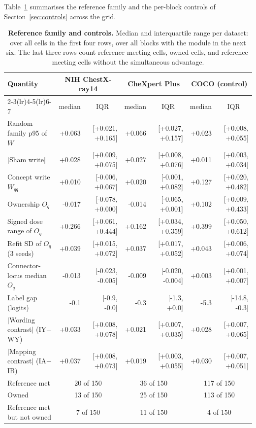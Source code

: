 \documentclass{article}
\begin{document}
Table~\ref{tab:cf-controls} summarises the reference family and the per-block controls of Section~\ref{sec:controls} across the grid.

\begin{table}[h]
\centering
\scriptsize
\setlength{\tabcolsep}{4pt}
\caption{\textbf{Reference family and controls.} Median and interquartile range per dataset: over all cells in the first four rows, over all blocks with the module in the next six. The last three rows count reference-meeting cells, owned cells, and reference-meeting cells without the simultaneous advantage.}
\label{tab:cf-controls}
\begin{tabular}{lrrrrrr}
\toprule
\multirow{2}{*}{Quantity} & \multicolumn{2}{c}{NIH ChestX-ray14} & \multicolumn{2}{c}{CheXpert Plus} & \multicolumn{2}{c}{COCO (control)}\\
\cmidrule(lr){2-3}\cmidrule(lr){4-5}\cmidrule(lr){6-7}
& \multicolumn{1}{c}{median} & \multicolumn{1}{c}{IQR} & \multicolumn{1}{c}{median} & \multicolumn{1}{c}{IQR} & \multicolumn{1}{c}{median} & \multicolumn{1}{c}{IQR}\\
\midrule
Random-family p95 of $W$ & +0.063 & [+0.021, +0.165] & +0.066 & [+0.027, +0.157] & +0.023 & [+0.008, +0.055] \\
$|$Sham write$|$ & +0.028 & [+0.009, +0.075] & +0.027 & [+0.008, +0.076] & +0.011 & [+0.003, +0.034] \\
Concept write $W_{qq}$ & +0.010 & [-0.006, +0.067] & +0.020 & [-0.001, +0.082] & +0.127 & [+0.020, +0.482] \\
Ownership $O_q$ & -0.017 & [-0.078, +0.000] & -0.014 & [-0.065, +0.001] & +0.102 & [+0.009, +0.433] \\
Signed dose range of $O_q$ & +0.266 & [+0.061, +0.444] & +0.162 & [+0.034, +0.359] & +0.399 & [+0.050, +0.612] \\
Refit SD of $O_q$ (3 seeds) & +0.039 & [+0.015, +0.072] & +0.037 & [+0.017, +0.052] & +0.043 & [+0.006, +0.074] \\
Connector-locus median $O_q$ & -0.013 & [-0.023, -0.005] & -0.009 & [-0.020, -0.004] & +0.003 & [+0.001, +0.007] \\
Label gap (logits) & -0.1 & [-0.9, -0.0] & -0.3 & [-1.3, +0.0] & -5.3 & [-14.8, -0.3] \\
$|$Wording contrast$|$ (IY$-$WY) & +0.033 & [+0.008, +0.078] & +0.021 & [+0.007, +0.035] & +0.028 & [+0.007, +0.065] \\
$|$Mapping contrast$|$ (IA$-$IB) & +0.037 & [+0.008, +0.073] & +0.019 & [+0.003, +0.055] & +0.030 & [+0.007, +0.051] \\
\midrule
Reference met & \multicolumn{2}{c}{20 of 150} & \multicolumn{2}{c}{36 of 150} & \multicolumn{2}{c}{117 of 150} \\
Owned & \multicolumn{2}{c}{13 of 150} & \multicolumn{2}{c}{25 of 150} & \multicolumn{2}{c}{113 of 150} \\
Reference met but not owned & \multicolumn{2}{c}{7 of 150} & \multicolumn{2}{c}{11 of 150} & \multicolumn{2}{c}{4 of 150} \\
\bottomrule
\end{tabular}
\end{table}
\end{document}
